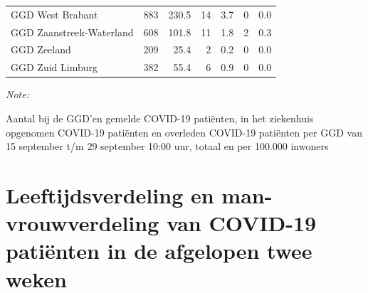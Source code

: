 \documentclass[
  english,
  man,floatsintext]{apa6}
\begin{document}
\begin{table}[H]
\begin{threeparttable}
\begin{tabular}{lrrrrrr}
GGD West Brabant & 883 & 230.5 & 14 & 3.7 & 0 & 0.0\\
GGD Zaanstreek-Waterland & 608 & 101.8 & 11 & 1.8 & 2 & 0.3\\
GGD Zeeland & 209 & 25.4 & 2 & 0.2 & 0 & 0.0\\
GGD Zuid Limburg & 382 & 55.4 & 6 & 0.9 & 0 & 0.0\\
\bottomrule
\end{tabular}
\begin{tablenotes}
\item \textit{Note: } 
\item Aantal bij de GGD’en gemelde COVID-19 patiënten, in het ziekenhuis opgenomen COVID-19 patiënten en overleden COVID-19 patiënten per GGD van 15 september t/m 29 september 10:00 uur, totaal en per 100.000 inwoners
\end{tablenotes}
\end{threeparttable}
\endgroup{}
\end{table}

\newpage

\hypertarget{leeftijdsverdeling-en-man-vrouwverdeling-van-covid-19-patiuxebnten-in-de-afgelopen-twee-weken}{%
\section{Leeftijdsverdeling en man-vrouwverdeling van COVID-19 patiënten in de afgelopen twee weken}\label{leeftijdsverdeling-en-man-vrouwverdeling-van-covid-19-patiuxebnten-in-de-afgelopen-twee-weken}}
\end{document}
